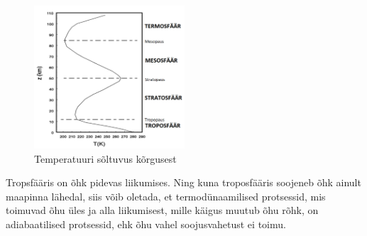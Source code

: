 \documentclass{trkut}%
\begin{document}
\begin{figure}[h]
	\includegraphics[width=0.5\textwidth]{PicGra/Profile2.png}
	\caption{Temperatuuri sõltuvus kõrgusest}
	\label{profile}%
\end{figure}

Tropsfääris on õhk pidevas liikumises. Ning kuna troposfääris soojeneb õhk ainult maapinna lähedal, siis võib oletada, et termodünaamilised protsessid, mis toimuvad õhu üles ja alla liikumisest, mille käigus muutub õhu rõhk, on adiabaatilised protsessid, ehk õhu vahel soojusvahetust ei toimu.
\end{document}
